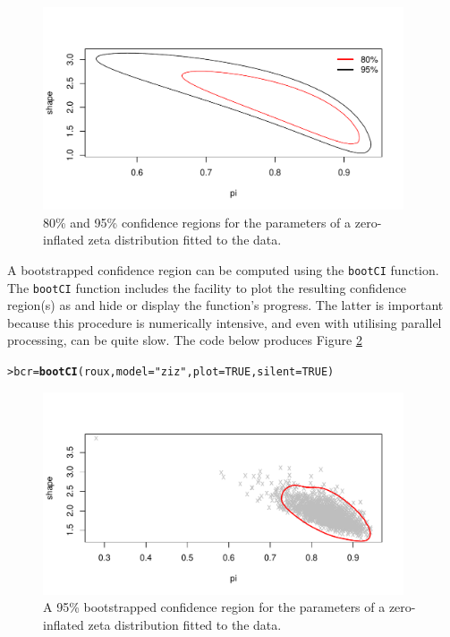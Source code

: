 \documentclass{article}\usepackage[]{graphicx}\usepackage[]{xcolor}
\makeatletter
\newcommand{\hlnum}[1]{\textcolor[rgb]{0.686,0.059,0.569}{#1}}%
\newcommand{\hlstr}[1]{\textcolor[rgb]{0.192,0.494,0.8}{#1}}%
\newcommand{\hlstd}[1]{\textcolor[rgb]{0.345,0.345,0.345}{#1}}%
\newcommand{\hlkwb}[1]{\textcolor[rgb]{0.69,0.353,0.396}{#1}}%
\newcommand{\hlkwc}[1]{\textcolor[rgb]{0.333,0.667,0.333}{#1}}%
\newcommand{\hlkwd}[1]{\textcolor[rgb]{0.737,0.353,0.396}{\textbf{#1}}}%
\newenvironment{kframe}{%
 \def\at@end@of@kframe{}%
 \ifinner\ifhmode%
  \def\at@end@of@kframe{\end{minipage}}%
  \begin{minipage}{\columnwidth}%
 \fi\fi%
 \def\FrameCommand##1{\hskip\@totalleftmargin \hskip-\fboxsep
 \colorbox{shadecolor}{##1}\hskip-\fboxsep
     \hskip-\linewidth \hskip-\@totalleftmargin \hskip\columnwidth}%
 \MakeFramed {\advance\hsize-\width
   \@totalleftmargin\z@ \linewidth\hsize
   \@setminipage}}%
 {\par\unskip\endMakeFramed%
 \at@end@of@kframe}
\newenvironment{knitrout}{}{} %
\newcommand{\rcode}[1]{\lstinline[language=R,basicstyle=\normalsize\ttfamily]!#1!}
\makeatother
\begin{document}
\begin{figure}[ht]
\centering
  \includegraphics[width=0.95\textwidth,keepaspectratio]{confregion}
  \caption{80\% and 95\% confidence regions for the parameters of a zero-inflated zeta distribution fitted to the \citet{roux2001} data.}
  \label{fig:confregion}
\end{figure}
A bootstrapped confidence region can be computed using the \rcode{bootCI} function. The \rcode{bootCI} function includes the facility to plot the resulting confidence
region(s) as and hide or display the function's progress. The latter is important because this procedure is numerically intensive, and even with utilising parallel processing, can be quite slow. The code below produces Figure \ref{fig:bootconfregion}
\begin{knitrout}
\color{fgcolor}\begin{kframe}
\begin{alltt}
\hlstd{> }\hlstd{bcr} \hlkwb{=} \hlkwd{bootCI}\hlstd{(roux,} \hlkwc{model} \hlstd{=} \hlstr{"ziz"}\hlstd{,} \hlkwc{plot} \hlstd{=} \hlnum{TRUE}\hlstd{,} \hlkwc{silent} \hlstd{=} \hlnum{TRUE}\hlstd{)}
\end{alltt}
\end{kframe}
\end{knitrout}\noindent
\begin{figure}[ht]
\centering
  \includegraphics[width=0.95\textwidth,keepaspectratio]{bootconfregion}
  \caption{A 95\% bootstrapped confidence region for the parameters of a zero-inflated zeta distribution fitted to the \citet{roux2001} data.}
  \label{fig:bootconfregion}
\end{figure}
\end{document}
